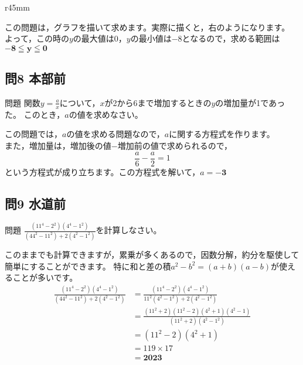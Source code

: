 \documentclass[a5paper]{ltjsarticle}
\begin{document}
\begin{wrapfigure}{r}{45mm}
  \vspace{-50mm}
\end{wrapfigure}
この問題は，グラフを描いて求めます。実際に描くと，右のようになります。\\
よって，この時の$y$の最大値は$0$，$y$の最小値は$-8$となるので，求める範囲は$\bm{-8 \leqq y \leqq 0}$
\vspace{45mm}


\subsection*{問8 本部前}
\begin{itembox}[l]{問題}
  関数$\displaystyle y=\frac{a}{x}$について，$x$が2から6まで増加するときの$y$の増加量が1であった。
  このとき，$a$の値を求めなさい。
\end{itembox}

この問題では，$a$の値を求める問題なので，$a$に関する方程式を作ります。\\
また，増加量は，増加後の値$-$増加前の値で求められるので，\\
\[\frac{a}{6}-\frac{a}{2}=1\]
という方程式が成り立ちます。この方程式を解いて，$a=\mathbf{-3}$\\


\subsection*{問9 水道前}
\begin{itembox}[l]{問題}
  $\displaystyle \frac{(11^4-2^2)(4^4-1^2)}{(44^2-11^2)+2(4^2-1^2)}$を計算しなさい。
\end{itembox}

このままでも計算できますが，累乗が多くあるので，因数分解，約分を駆使して簡単にすることができます。
特に和と差の積$a^2-b^2=(a+b)(a-b)$が使えることが多いです。
\begin{align*}
  \frac{(11^4-2^2)(4^4-1^2)}{(44^2-11^2)+2(4^2-1^2)}&=\frac{(11^4-2^2)(4^4-1^2)}{11^2(4^2-1^2)+2(4^2-1^2)}\\
  &=\frac{(11^2+2)(11^2-2)(4^2+1)(4^2-1)}{(11^2+2)(4^2-1^2)}\\
  &=(11^2-2)(4^2+1)\\
  &=119\times 17\\
  &=\mathbf{2023}
\end{align*}
\end{document}
